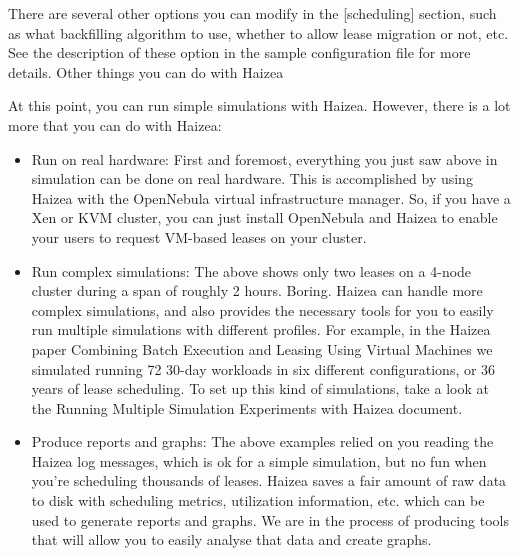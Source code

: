 There are several other options you can modify in the [scheduling] section, such as what backfilling algorithm to use, whether to allow lease migration or not, etc. See the description of these option in the sample configuration file for more details.
Other things you can do with Haizea

At this point, you can run simple simulations with Haizea. However, there is a lot more that you can do with Haizea:

\begin{itemize}
\item Run on real hardware: First and foremost, everything you just saw above in simulation can be done on real hardware. This is accomplished by using Haizea with the OpenNebula virtual infrastructure manager. So, if you have a Xen or KVM cluster, you can just install OpenNebula and Haizea to enable your users to request VM-based leases on your cluster.
\item Run complex simulations: The above shows only two leases on a 4-node cluster during a span of roughly 2 hours. Boring. Haizea can handle more complex simulations, and also provides the necessary tools for you to easily run multiple simulations with different profiles. For example, in the Haizea paper Combining Batch Execution and Leasing Using Virtual Machines we simulated running 72 30-day workloads in six different configurations, or 36 years of lease scheduling. To set up this kind of simulations, take a look at the Running Multiple Simulation Experiments with Haizea document.
\item Produce reports and graphs: The above examples relied on you reading the Haizea log messages, which is ok for a simple simulation, but no fun when you're scheduling thousands of leases. Haizea saves a fair amount of raw data to disk with scheduling metrics, utilization information, etc. which can be used to generate reports and graphs. We are in the process of producing tools that will allow you to easily analyse that data and create graphs.
\end{itemize}